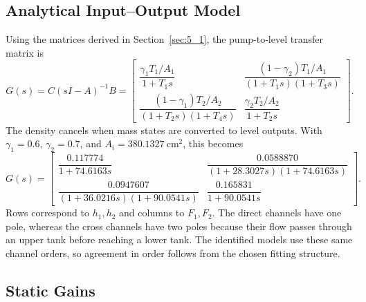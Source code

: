 \subsection{Analytical Input--Output Model}

Using the matrices derived in Section~\ref{sec:5_1}, the pump-to-level transfer
matrix is
\begin{equation}
 G(s)=C(sI-A)^{-1}B
 =\begin{bmatrix}
 \dfrac{\gamma_1T_1/A_1}{1+T_1s}&
 \dfrac{(1-\gamma_2)T_1/A_1}{(1+T_1s)(1+T_3s)}\\[6pt]
 \dfrac{(1-\gamma_1)T_2/A_2}{(1+T_2s)(1+T_4s)}&
 \dfrac{\gamma_2T_2/A_2}{1+T_2s}
 \end{bmatrix}.
 \label{eq:p5-analytical-structure}
\end{equation}
The density cancels when mass states are converted to level outputs.
With $\gamma_1=0.6$, $\gamma_2=0.7$, and
$A_i=380.1327\ \mathrm{cm^2}$, this becomes
\begin{equation}
 G(s)=\begin{bmatrix}
 \dfrac{0.117774}{1+74.6163s}&
 \dfrac{0.0588870}{(1+28.3027s)(1+74.6163s)}\\[6pt]
 \dfrac{0.0947607}{(1+36.0216s)(1+90.0541s)}&
 \dfrac{0.165831}{1+90.0541s}
 \end{bmatrix}.
 \label{eq:p5-analytical}
\end{equation}
Rows correspond to $h_1,h_2$ and columns to $F_1,F_2$. The direct
channels have one pole, whereas the cross channels have two poles
because their flow passes through an upper tank before reaching a lower
tank. The identified models use these same channel orders, so agreement
in order follows from the chosen fitting structure.

\subsection{Static Gains}

